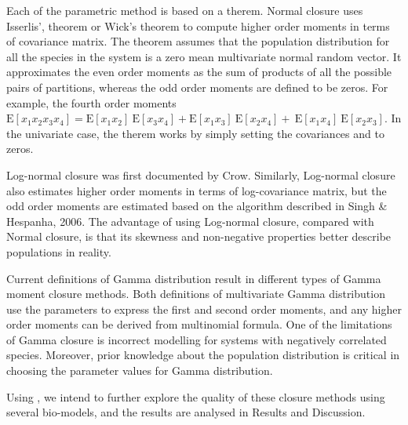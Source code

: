 Each of the parametric method is based on a therem.
Normal closure uses Isserlis\rq , theorem or Wick\rq s theorem to compute higher order moments in terms of covariance matrix. 
The theorem assumes that the population distribution for all the species in the system is a zero mean multivariate normal random vector. 
It approximates the even order moments as the sum of products of all the possible pairs of partitions, whereas the odd order moments are defined to be zeros. 
For example, the fourth order moments $\mathrm{E}[x_1x_2x_3x_4] = \mathrm{E}[x_1x_2]\ \mathrm{E}[x_3x_4] + \mathrm{E}[x_1x_3]\ \mathrm{E}[x_2x_4]+\ \mathrm{E}[x_1x_4]\ \mathrm{E}[x_2x_3]$. 
In the univariate case, the therem works by simply setting the covariances and to zeros. 

Log-normal closure was first documented by Crow.  
Similarly, Log-normal closure also estimates higher order moments in terms of log-covariance matrix, but the odd order moments are estimated based on the algorithm described in  Singh \& Hespanha, 2006.  The advantage of using Log-normal closure, compared with Normal closure, is that its skewness and non-negative properties better describe populations in reality.

Current definitions of Gamma distribution result in different types of Gamma moment closure methods. Both definitions of multivariate Gamma distribution use the parameters  to express the first and second order moments, and any higher order moments can be derived from multinomial formula.  One of the limitations of Gamma closure is incorrect modelling for systems with negatively correlated species. 
Moreover, prior knowledge about the population distribution is critical in choosing the parameter values for Gamma distribution. 

Using \means, we intend to further explore the quality of these closure methods using several bio-models, and the results are analysed in Results and Discussion.
 


